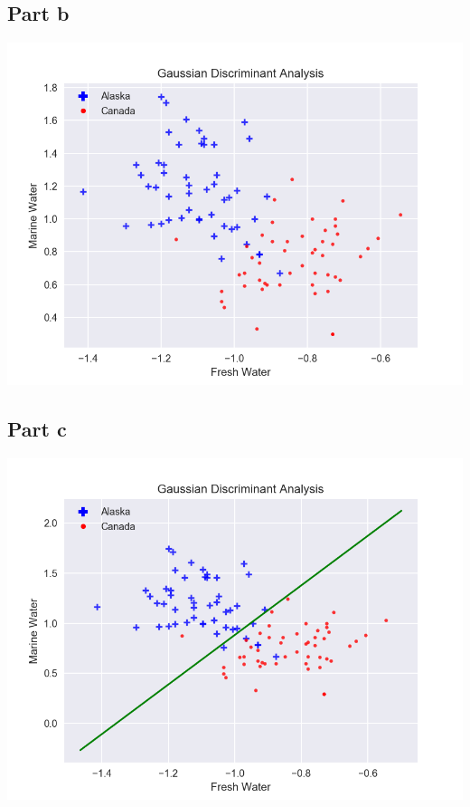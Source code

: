 \documentclass[12pt]{article}
\begin{document}
\subsection*{Part b}
\begin{center}
\includegraphics[scale=0.4]{gda1.png}
\end{center}
\subsection*{Part c}
\begin{center}
\includegraphics[scale=0.4]{gda2.png}
\end{center}
\end{document}
